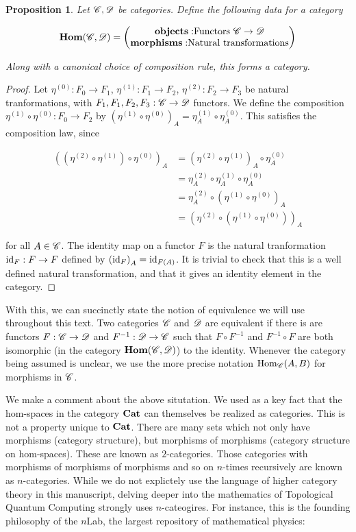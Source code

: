 \documentclass{article}
\newtheorem{proposition}{Proposition}[section]
\theoremstyle{definition}
\numberwithin{figure}{section}
\begin{document}
\begin{proposition} Let $\mathscr{C},\mathscr{D}$ be categories. Define the following data for a category


$$\bold{Hom}(\mathscr{C},\mathscr{D})=
\begin{pmatrix}
\bold{objects:}\mathrm{Functors }\,\,\mathscr{C}\to \mathscr{D}\\
\bold{morphisms:}\mathrm{Natural} \,\,\mathrm{transformations}
\end{pmatrix}$$

Along with a canonical choice of composition rule, this forms a category.
\end{proposition}
\begin{proof} Let $\eta^{(0)}: F_0\to F_1$, $\eta^{(1)}:F_1\to F_2$, $\eta^{(2)}: F_2\to F_3$ be natural tranformations, with $F_1,F_1,F_2,F_3:\mathscr{C}\to \mathscr{D}$ functors. We define the composition $\eta^{(1)}\circ \eta^{(0)}:F_0\to F_2$ by $\left(\eta^{(1)}\circ \eta^{(0)}\right)_A=\eta^{(1)}_A\circ \eta^{(0)}_A$. This satisfies the composition law, since

\begin{align*}
\left(\left(\eta^{(2)}\circ \eta^{(1)}\right)\circ \eta^{(0)}\right)_A&=\left(\eta^{(2)}\circ \eta^{(1)}\right)_A\circ \eta^{(0)}_A\\
&=\eta^{(2)}_A\circ \eta^{(1)}_A\circ \eta^{(0)}_A\\
&=\eta^{(2)}_A\circ \left(\eta^{(1)}\circ \eta^{(0)}\right)_A\\
&=\left(\eta^{(2)}\circ \left(\eta^{(1)}\circ \eta^{(0)}\right)\right)_A
\end{align*}

for all $A\in \mathscr{C}$. The identity map on a functor $F$ is the natural tranformation $\mathrm{id}_{F}:F\to F$ defined by $\left(\mathrm{id}_F\right)_A=\mathrm{id}_{F(A)}$. It is trivial to check that this is a well defined natural transformation, and that it gives an identity element in the category.
\end{proof}

With this, we can succinctly state the notion of equivalence we will use throughout this text. Two categories $\mathscr{C}$ and $\mathscr{D}$ are equivalent if there is are functors $F:\mathscr{C}\to \mathscr{D}$ and $F^{-1}:\mathscr{D}\to \mathscr{C}$ such that $F\circ F^{-1}$ and $F^{-1}\circ F$ are both isomorphic (in the category $\bold{Hom}(\mathscr{C},\mathscr{D})$) to the identity. Whenever the category being assumed is unclear, we use the more precise notation $\mathrm{Hom}_{\mathscr{C}}(A,B)$ for morphisms in $\mathscr{C}$.

We make a comment about the above situtation. We used as a key fact that the hom-spaces in the category $\bold{Cat}$ can themselves be realized as categories. This is not a property unique to $\bold{Cat}$. There are many sets which not only have morphisms (category structure), but morphisms of morphisms (category structure on hom-spaces). These are known as $2$-categories. Those categories with morphisms of morphisms of morphisms and so on $n$-times recursively are known as $n$-categories. While we do not explictely use the language of higher category theory in this manuscript, delving deeper into the mathematics of Topological Quantum Computing strongly uses $n$-cateogires. For instance, this is the founding philosophy of the $n$Lab, the largest repository of mathematical physics:
\end{document}
